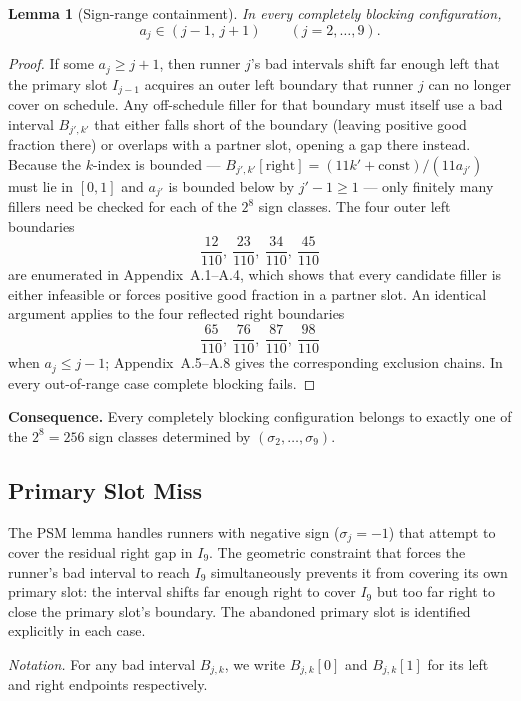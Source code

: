 \documentclass[12pt,a4paper]{amsart}
\newtheorem{lemma}[theorem]{Lemma}
\theoremstyle{definition}
\theoremstyle{remark}
\begin{document}
\begin{lemma}[Sign-range containment]\label{lem:sign-range}
In every completely blocking configuration,
\[
  a_j \in (j-1,\,j+1)\qquad(j=2,\ldots,9).
\]
\end{lemma}

\begin{proof}
If some $a_j\ge j+1$, then runner $j$'s bad intervals shift far enough left that the
primary slot $I_{j-1}$ acquires an outer left boundary that runner $j$ can no longer
cover on schedule. Any off-schedule filler for that boundary must itself use a bad interval
$B_{j',k'}$ that either falls short of the boundary (leaving positive good fraction there)
or overlaps with a partner slot, opening a gap there instead. Because the $k$-index is
bounded — $B_{j',k'}[\text{right}]=(11k'+\text{const})/(11a_{j'})$ must lie in $[0,1]$
and $a_{j'}$ is bounded below by $j'-1\ge 1$ — only finitely many fillers need be checked
for each of the $2^8$ sign classes. The four outer left boundaries
\[
  \frac{12}{110},\ \frac{23}{110},\ \frac{34}{110},\ \frac{45}{110}
\]
are enumerated in Appendix~A.1--A.4, which shows that every candidate filler is either
infeasible or forces positive good fraction in a partner slot. An identical argument applies
to the four reflected right boundaries
\[
  \frac{65}{110},\ \frac{76}{110},\ \frac{87}{110},\ \frac{98}{110}
\]
when $a_j\le j-1$; Appendix~A.5--A.8 gives the corresponding exclusion chains.
In every out-of-range case complete blocking fails.
\end{proof}

\noindent\textbf{Consequence.} Every completely blocking configuration belongs to exactly
one of the $2^8=256$ sign classes determined by $(\sigma_2,\ldots,\sigma_9)$.

\subsection{Primary Slot Miss}

The PSM lemma handles runners with negative sign ($\sigma_j=-1$) that attempt to cover the
residual right gap in $I_9$. The geometric constraint that forces the runner's bad interval
to reach $I_9$ simultaneously prevents it from covering its own primary slot: the interval
shifts far enough right to cover $I_9$ but too far right to close the primary slot's boundary.
The abandoned primary slot is identified explicitly in each case.

\noindent\textit{Notation.} For any bad interval $B_{j,k}$, we write $B_{j,k}[0]$ and
$B_{j,k}[1]$ for its left and right endpoints respectively.
\end{document}
